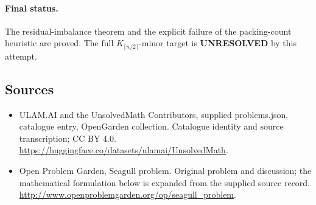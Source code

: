 \documentclass[11pt,a4paper]{article}
\begin{document}
\paragraph{Final status.}
The residual-imbalance theorem and the explicit failure of the packing-count heuristic are proved. The full $K_{\lceil n/2\rceil}$-minor target is \textbf{UNRESOLVED} by this attempt.

\subsection{Sources}
\begin{itemize}
\item[S1] ULAM.AI and the UnsolvedMath Contributors, supplied problems.json, catalogue entry, OpenGarden collection. Catalogue identity and source transcription; CC BY 4.0.
\url{https://huggingface.co/datasets/ulamai/UnsolvedMath}.
\item[S2] Open Problem Garden, Seagull problem. Original problem and discussion; the mathematical formulation below is expanded from the supplied source record.
\url{http://www.openproblemgarden.org/op/seagull_problem}.

\end{itemize}
\end{document}
